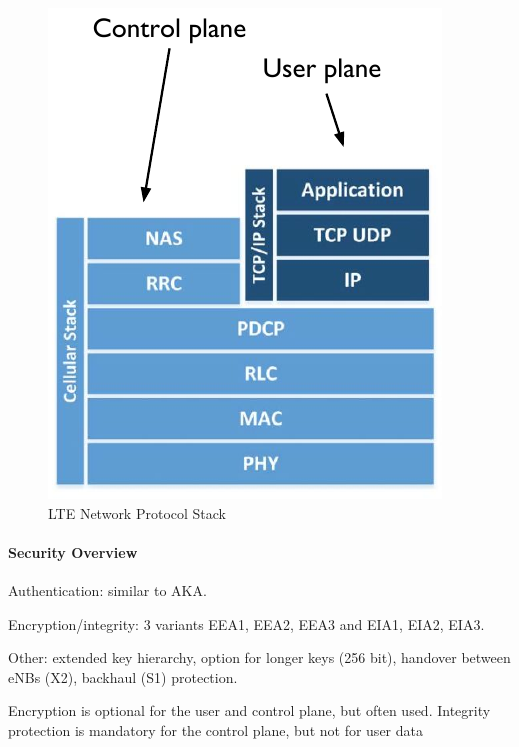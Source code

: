 \begin{figure}
	\centering
	\includegraphics[scale=0.5]{images/10-4g-network-stack.png}
	\caption{LTE Network Protocol Stack}
	\label{fig:4g-network-stack}
\end{figure}

\paragraph{Security Overview}
Authentication: similar to AKA.

Encryption/integrity: 3 variants EEA1, EEA2, EEA3 and EIA1, EIA2, EIA3.

Other: extended key hierarchy, option for longer keys (256 bit), handover
between eNBs (X2), backhaul (S1) protection.

Encryption is optional for the user and control plane, but often used.
Integrity protection is mandatory for the control plane, but not for user data

